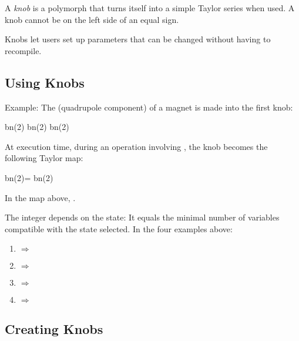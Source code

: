 %
A \emph{knob} is a polymorph that turns itself into a simple Taylor
series when used. A knob cannot be on the left side of an equal sign.

Knobs let users set up parameters that can be changed without having to recompile.


\subsection{Using Knobs}

%
Example: The  (quadrupole component) of a magnet is
made into the first knob:

\begin{ptccode}
bn(2)%
bn(2)%
bn(2)%
\end{ptccode}

At execution time, during an operation involving , the
knob becomes the following Taylor map:

\begin{ptccode}
bn(2)= bn(2)%
\end{ptccode}

In the map above, .

The integer  depends on the state: It equals
the minimal number of variables compatible with the state selected.
In the four  examples above:
\begin{enumerate}
  \item {} $\Rightarrow$ 
  \item {} $\Rightarrow$ 
  \item {} $\Rightarrow$ 
  \item {} $\Rightarrow$ 
\end{enumerate}


\subsection{Creating Knobs}

